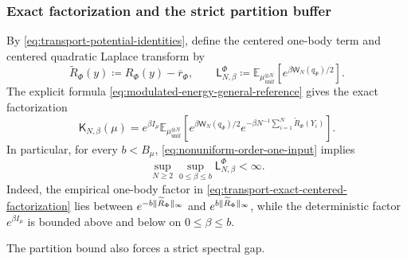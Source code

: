 \documentclass[11pt,reqno]{amsart}
\numberwithin{equation}{section}
\theoremstyle{plain}
\theoremstyle{definition}
\DeclarePairedDelimiter{\norm}{\lVert}{\rVert}
\newcommand{\E}{\mathbb E}
\newcommand{\be}{\beta}
\newcommand{\K}{\mathsf K}
\newcommand{\tl}{\widetilde}
\newcommand{\muunif}{\mu_{\mathrm{unif}}}
\begin{document}
\subsubsection{Exact factorization and the strict partition buffer}

By \eqref{eq:transport-potential-identities}, define the centered one-body term and centered quadratic Laplace transform by
\begin{equation}
 \tl R_\Phi(y)\coloneqq R_\Phi(y)-\overline r_\Phi,
 \qquad
 \mathsf L_{N,\be}^{\Phi}
 \coloneqq\E_{\muunif^{\otimes N}}\left[e^{\be\mathsf W_N(q_\Phi)/2}\right].
 \label{eq:transport-centered-onebody-partition}
\end{equation}
The explicit formula \eqref{eq:modulated-energy-general-reference} gives the exact factorization
\begin{equation}
 \K_{N,\be}(\mu)
 =e^{\be I_{\mu}}
 \E_{\muunif^{\otimes N}}\left[
 e^{\be\mathsf W_N(q_\Phi)/2}
 e^{-\be N^{-1}\sum_{i=1}^N\tl R_\Phi(Y_i)}
 \right].
 \label{eq:transport-exact-centered-factorization}
\end{equation}
In particular, for every $b<B_\mu$, \eqref{eq:nonuniform-order-one-input} implies
\begin{equation}
 \sup_{N\geq2}\sup_{0\leq\be\leq b}\mathsf L_{N,\be}^{\Phi}<\infty.
 \label{eq:transport-centered-partition-buffer}
\end{equation}
Indeed, the empirical one-body factor in \eqref{eq:transport-exact-centered-factorization} lies between $e^{-b\norm{\tl R_\Phi}_{\infty}}$ and $e^{b\norm{\tl R_\Phi}_{\infty}}$, while the deterministic factor $e^{\be I_\mu}$ is bounded above and below on $0\leq\be\leq b$.

The partition bound also forces a strict spectral gap.
\end{document}
